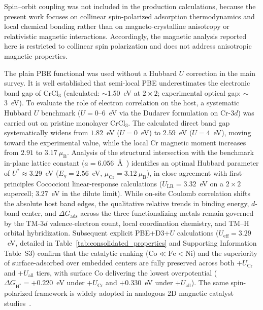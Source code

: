 \documentclass[journal=jacsat,manuscript=article]{achemso}
\begin{document}
{\color{revcolor}%
  Spin--orbit coupling was not included in the production calculations, because the present work focuses on collinear spin-polarized adsorption thermodynamics and local chemical bonding rather than on magneto-crystalline anisotropy or relativistic magnetic interactions. Accordingly, the magnetic analysis reported here is restricted to collinear spin polarization and does not address anisotropic magnetic
  properties.
\par}

{\color{revcolor}%
  The plain PBE functional was used without a Hubbard $U$ correction in the main survey. It is well established that semi-local PBE underestimates the electronic band gap of CrCl$_3$ (calculated: $\sim$1.50~eV at $2\times 2$; experimental optical gap: $\sim$3~eV). To evaluate the role of electron correlation on the host, a systematic Hubbard $U$ benchmark ($U = 0\text{--}6$~eV via the Dudarev formulation on Cr-$3d$) was carried out on pristine monolayer CrCl$_3$. The calculated direct band gap systematically widens from $1.82$~eV ($U=0$~eV) to $2.59$~eV ($U=4$~eV), moving toward the experimental value, while the local Cr magnetic moment increases from $2.91$ to $3.17~\mu_{\mathrm{B}}$. Analysis of the structural intersection with the benchmark in-plane lattice constant ($a = 6.056$~\AA~\cite{Webster2018}) identifies an optimal Hubbard parameter of $U^* \approx 3.29$~eV ($E_g = 2.56$~eV, $\mu_{\mathrm{Cr}} = 3.12~\mu_{\mathrm{B}}$), in close agreement with first-principles Cococcioni linear-response calculations ($U_{\text{LR}} = 3.32$~eV on a $2\times 2$ supercell; $3.27$~eV in the dilute limit). While on-site Coulomb correlation shifts the absolute host band edges, the qualitative relative trends in binding energy, $d$-band center, and $\Delta G_{\mathrm{ads}}$ across the three functionalizing metals remain governed by the TM-$3d$ valence-electron count, local coordination chemistry, and TM--H orbital hybridization. Subsequent explicit PBE+D3+$U$ calculations ($U_{\text{eff}} = 3.29$~eV, detailed in Table~\ref{tab:consolidated_properties} and Supporting Information Table~S3) confirm that the catalytic ranking ($\text{Co} \ll \text{Fe} < \text{Ni}$) and the superiority of surface-adsorbed over embedded centers are fully preserved across both $+U_{\text{Cr}}$ and $+U_{\text{all}}$ tiers, with surface Co delivering the lowest overpotential ($\Delta G_{\mathrm{H}^*} = +0.220$~eV under $+U_{\text{Cr}}$ and $+0.330$~eV under $+U_{\text{all}}$). The same spin-polarized framework is widely adopted in analogous 2D magnetic catalyst studies~\cite{Zala2024,Ipaves2025,Liao2022}.
\par}
\end{document}
